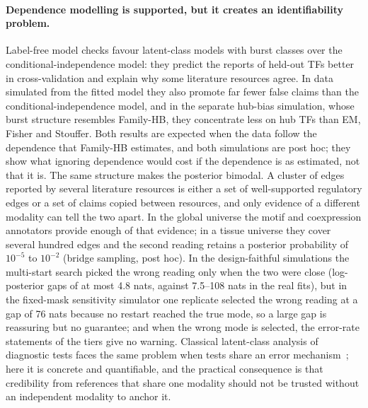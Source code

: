\documentclass[11pt,a4paper]{article}
\begin{document}
\paragraph{Dependence modelling is supported, but it creates an identifiability problem.}
Label-free model checks favour latent-class models with burst classes over the conditional-independence model: they predict the reports of held-out TFs better in cross-validation and explain why some literature resources agree. In data simulated from the fitted model they also promote far fewer false claims than the conditional-independence model, and in the separate hub-bias simulation, whose burst structure resembles Family-HB, they concentrate less on hub TFs than EM, Fisher and Stouffer. Both results are expected when the data follow the dependence that Family-HB estimates, and both simulations are post hoc; they show what ignoring dependence would cost if the dependence is as estimated, not that it is.
The same structure makes the posterior bimodal.
A cluster of edges reported by several literature resources is either a set of well-supported regulatory edges or a set of claims copied between resources, and only evidence of a different modality can tell the two apart.
In the global universe the motif and coexpression annotators provide enough of that evidence; in a tissue universe they cover several hundred edges and the second reading retains a posterior probability of \ensuremath{10^{-5}} to \ensuremath{10^{-2}} (bridge sampling, post hoc).
In the design-faithful simulations the multi-start search picked the wrong reading only when the two were close (log-posterior gaps of at most 4.8 nats, against 7.5--108 nats in the real fits), but in the fixed-mask sensitivity simulator one replicate selected the wrong reading at a gap of 76 nats because no restart reached the true mode, so a large gap is reassuring but no guarantee; and when the wrong mode is selected, the error-rate statements of the tiers give no warning.
Classical latent-class analysis of diagnostic tests faces the same problem when tests share an error mechanism~\citep{albert2004cautionary}; here it is concrete and quantifiable, and the practical consequence is that credibility from references that share one modality should not be trusted without an independent modality to anchor it.
\end{document}
